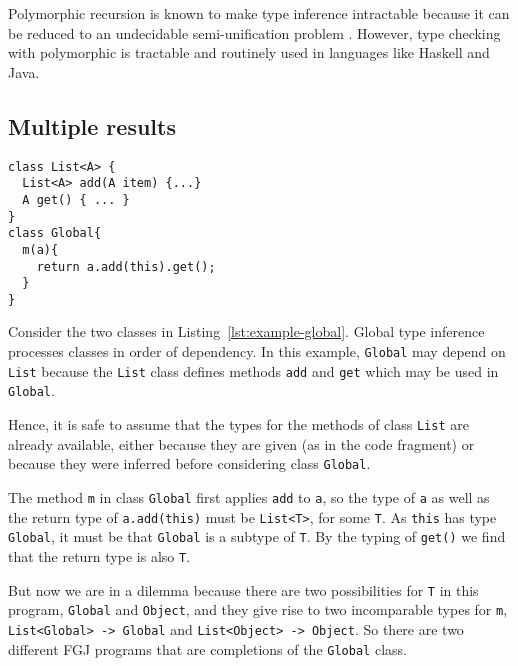 Polymorphic recursion is known to make type inference intractable
\cite{DBLP:journals/toplas/Henglein93,DBLP:journals/toplas/KfouryTU93}
because it can be reduced to an undecidable semi-unification problem
\cite{DBLP:journals/iandc/KfouryTU93}. However, type checking with
polymorphic is tractable and routinely used in languages like Haskell
and Java.

\subsection{Multiple results}
\label{sec:multiple-results}
\begin{lstlisting}[float,caption={Types are not unique},label={lst:example-global}]
class List<A> {
  List<A> add(A item) {...}
  A get() { ... }
}
class Global{
  m(a){
    return a.add(this).get();
  }
}
\end{lstlisting}
Consider the two classes in Listing~\ref{lst:example-global}.
Global type inference processes classes in order of
dependency. In this example, \texttt{Global} may depend on
\texttt{List} because the \texttt{List} class defines methods \texttt{add} and
\texttt{get} which may be used in \texttt{Global}. 

Hence, it is safe to assume that the types for the methods of class \texttt{List}
are already available, either because they are given (as in the code
fragment) or because they were inferred before considering class \lstinline{Global}.

The method \texttt{m} in class \texttt{Global} first applies
\texttt{add} to \texttt{a}, so the type of \texttt{a} as well as the
return type of \texttt{a.add(this)} must be
\texttt{List<T>}, for some \texttt{T}. As \texttt{this} has
type \texttt{Global}, it must be that \lstinline{Global} is a
subtype of \lstinline{T}. By the typing of \texttt{get()} we find that
the return type is also \lstinline{T}.

But now we are in a dilemma because there are two possibilities for
\lstinline{T} in this program, \lstinline{Global} and
\lstinline{Object}, and they give rise to two incomparable types for
\lstinline{m}, \lstinline{List<Global> -> Global} and
\lstinline{List<Object> -> Object}. So there are two different FGJ
programs that are completions of the \lstinline{Global} class.

